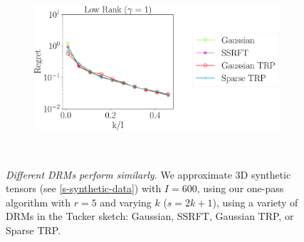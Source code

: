 \begin{figure}
\begin{subfigure}{0.3\textwidth}
	\end{subfigure}
	\begin{subfigure}{0.5\textwidth}
		\includegraphics[scale = 0.24]{figure/fig2_lk_hnoise_600.pdf}
	\end{subfigure}
	\\
	\caption{\textit{Different DRMs perform similarly.}
		We approximate 3D synthetic tensors (see \ref{s-synthetic-data}) with $I = 600$,
		using our one-pass algorithm with $r = 5$ and varying $k$ ($s = 2k+1$),
		using a variety of DRMs in the Tucker sketch:
		Gaussian, SSRFT, Gaussian TRP, or Sparse TRP.
		\label{fig:vary-k-600}
	}
\end{figure}

